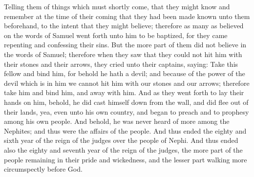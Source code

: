 Telling them of things which must shortly come, that they might know and remember at the time of their coming that they had been made known unto them beforehand, to the intent that they might believe; therefore as many as believed on the words of Samuel went forth unto him to be baptized, for they came repenting and confessing their sins.
\bverse \iffalse But the more part of them did not believe in the words of Samuel; therefore when they saw that they could not hit him with their stones and their arrows, they cried unto their captains, saying: Take this fellow and bind him, for behold he hath a devil; and because of the power of the devil which is in him we cannot hit him with our stones and our arrows; therefore take him and bind him, and away with him. \fi
But the more part of them did not believe in the words of Samuel; therefore when they saw that they could not hit him with their stones and their arrows, they cried unto their captains, saying: Take this fellow and bind him, for behold he hath a devil; and because of the power of the devil which is in him we cannot hit him with our stones and our arrows; therefore take him and bind him, and away with him.
\bverse \iffalse And as they went forth to lay their hands on him, behold, he did cast himself down from the wall, and did flee out of their lands, yea, even unto his own country, and began to preach and to prophesy among his own people. \fi
And as they went forth to lay their hands on him, behold, he did cast himself down from the wall, and did flee out of their lands, yea, even unto his own country, and began to preach and to prophesy among his own people.
\bverse \iffalse And behold, he was never heard of more among the Nephites; and thus were the affairs of the people. \fi
And behold, he was never heard of more among the Nephites; and thus were the affairs of the people.
\bverse \iffalse And thus ended the eighty and sixth year of the reign of the judges over the people of Nephi. \fi
And thus ended the eighty and sixth year of the reign of the judges over the people of Nephi.
\bverse \iffalse And thus ended also the eighty and seventh year of the reign of the judges, the more part of the people remaining in their pride and wickedness, and the lesser part walking more circumspectly before God. \fi
And thus ended also the eighty and seventh year of the reign of the judges, the more part of the people remaining in their pride and wickedness, and the lesser part walking more circumspectly before God.
\bverse \iffalse And these were the conditions also, in the eighty and eighth year of the reign of the judges. \fi
